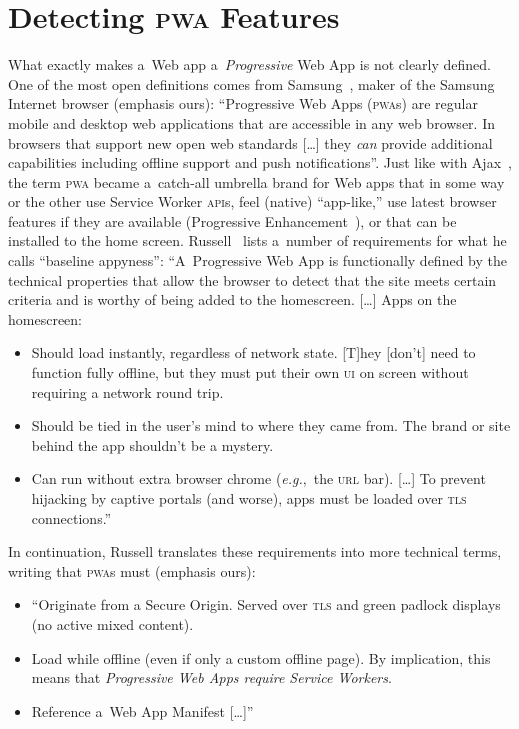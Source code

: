 \documentclass[sigconf]{acmart}
\begin{document}
\section{Detecting \textsc{pwa} Features}
\label{sec:pwa-feature-detector}

What exactly makes a~Web app a~\emph{Progressive} Web App is not clearly defined.
One of the most open definitions comes from Samsung~\cite{samsung2017pwa},
maker of the Samsung Internet browser (emphasis ours):
``Progressive Web Apps (\textsc{pwa}s) are regular mobile and desktop web applications
that are accessible in any web browser.
In browsers that support new open web standards [\ldots]
they \emph{can} provide additional capabilities
including offline support and push notifications''.
Just like with Ajax~\cite{garret2005ajax}, the term \textsc{pwa}
became a~catch-all umbrella brand for Web apps
that in some way or the other use Service Worker \textsc{api}s,
feel (native) ``app-like,'' use latest browser features if they are available
(Progressive Enhancement~\cite{champeon2003progressiveenhancement}),
or that can be installed to the home screen.
Russell~\cite{russell2016pwa} lists a~number of requirements 
for what he calls ``baseline appyness'':
``A~Progressive Web App is functionally defined by the technical properties
that allow the browser to detect that the site meets certain criteria
and is worthy of being added to the homescreen.
[\ldots]
Apps on the homescreen:

\begin{itemize}
  \item Should load instantly, regardless of network state.
    [T]hey [don't] need to function fully offline,
    but they must put their own \textsc{ui} on screen without requiring a network round trip.
  \item Should be tied in the user's mind to where they came from.
    The brand or site behind the app shouldn't be a mystery.
  \item Can run without extra browser chrome (\emph{e.g.},\ the \textsc{url} bar).
    [\ldots] To prevent hijacking by captive portals (and worse),
    apps must be loaded over \textsc{tls} connections.''
\end{itemize}

In continuation, Russell translates these requirements into more technical terms,
writing that \textsc{pwa}s must (emphasis ours):

\begin{itemize}
  \item ``Originate from a Secure Origin.
    Served over \textsc{tls} and green padlock displays (no active mixed content).
  \item Load while offline (even if only a custom offline page).
    By implication, this means that \emph{Progressive Web Apps require Service Workers}.
  \item Reference a~Web App Manifest [\ldots]''
\end{itemize}
\end{document}
